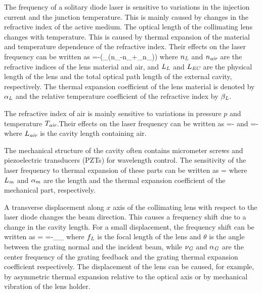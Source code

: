 The frequency of a solitary diode laser is sensitive to variations in the injection current and the junction temperature. This is mainly caused by changes in the refractive index of the active medium.
The optical length of the collimating lens changes with temperature. This is caused by thermal expansion of the material and temperature dependence of the refractive index. Their effects on the laser frequency can be written as 
\mate
{}=-\nu{}\left(\alpha_{}\left(n_{}-n_{}+\beta_{}n_{}\right)\right)
\label{effect1}
\atem
where $n_{\textit{L}}$ and $n_{\textit{air}}$ are the refractive indices of the lens material and air, and $L_{\textit{L}}$ and $L_{\textit{EC}}$ are the physical length of the lens and the total optical path length of the external cavity, respectively. The thermal expansion coefficient of the lens material is denoted by $\alpha_{\textit{L}}$ and the relative temperature coefficient of the refractive index by $\beta_{\textit{L}}$. 


The refractive index of air is mainly sensitive to variations in pressure $p$ and temperature $T_{\textit{air}}$.Their effects on the laser frequency can be written as
\mate
{}=-\nu{}
\label{effect2}
\atem
and
\mate
{}=-\nu{}
\label{effect3}
\atem
where $L_{\textit{air}}$ is the cavity length containing air.
	

The mechanical structure of the cavity often contains micrometer screws and piezoelectric transducers (PZTs) for wavelength control. The sensitivity of the laser frequency to thermal expansion of these parts can be written as
\mate
{}=\pm\nu{}
\label{effect4}
\atem
where $L_{\textit{m}}$ and $\alpha_{\textit{m}}$ are the length and the thermal expansion coefficient of the mechanical part, respectively.


A transverse displacement along $x$ axis of the collimating lens with respect to the laser diode changes the beam direction. This causes a frequency shift due to a change in the cavity length. For a small displacement, the frequency shift can be written as
\mate
{}=
\label{displacement}\atem
\mate
{}=-\nu_{}\alpha_{}
\label{displacement2}
\atem
where $f_{\textit{L}}$ is the focal length of the lens and $\theta$ is the angle between the grating normal and the incident beam, while $\nu_{\textit{G}}$ and $\alpha_{\textit{G}}$ are the center frequency of the grating feedback and the grating thermal expansion coefficient respectively. The displacement of the lens can be caused, for example, by asymmetric thermal expansion relative to the optical axis or by mechanical vibration of the lens holder. 

